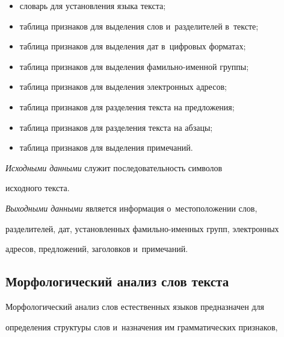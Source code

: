   \begin{itemize}


  \item словарь для установления языка текста;


  \item таблица признаков для выделения слов и~разделителей в~тексте;


  \item таблица признаков для выделения дат в~цифровых форматах;


\item   таблица признаков для выделения фамильно-именной группы;


  \item таблица признаков для выделения электронных адресов;


  \item таблица признаков для разделения текста на предложения;


  \item таблица признаков для разделения текста на абзацы;


  \item таблица признаков для выделения примечаний. 


  \end{itemize}


  


  \textit{Исходными данными} служит последовательность символов 


исходного текста.


  


  \textit{Выходными данными} является информация о~местоположении слов, 


разделителей, дат, установленных фа\-миль\-но-имен\-ных групп, электронных 


адресов, предложений, заголовков и~примечаний.


  





\subsection{Морфологический анализ слов текста}





  Морфологический анализ слов естественных языков предназначен для 


определения структуры слов и~назначения им грамматических признаков, 


